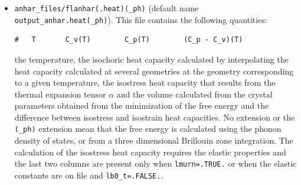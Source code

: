 \documentclass[12pt,a4paper]{article}
\begin{document}
\begin{itemize}
\item 
\texttt{anhar\_files/flanhar(.heat)(\_ph)} 
(default name \texttt{output\_anhar.heat(\_ph)}). 
This file contains the following quantities:
\begin{verbatim}
#   T       C_v(T)        C_p(T)        (C_p - C_v)(T)    
\end{verbatim}
the temperature, the isochoric heat capacity calculated 
by interpolating the heat capacity calculated at several geometries 
at the geometry corresponding to a given temperature, the isostress
heat capacity that results from the thermal expansion 
tensor $\alpha$ and the volume calculated from the crystal parameters 
obtained from the minimization of the free energy and the difference 
between isostress and isostrain heat capacities. No extension or 
the \texttt{(\_ph)} extension mean
that the free energy is calculated using the phonon density of states,
or from a three dimensional Brillouin zone integration.
The calculation of the isostress heat capacity requires the elastic 
properties and the last two columns are present only when 
\texttt{lmurn=.TRUE.} or when the elastic
constants are on file and \texttt{lb0\_t=.FALSE.}.


\end{itemize}
\end{document}
